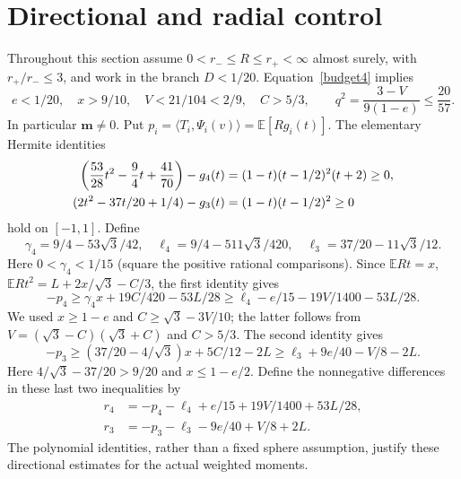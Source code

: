 \documentclass[11pt]{article}
\theoremstyle{remark}\newtheorem{remark}[theorem]{Remark}
\newcommand{\E}{\mathbb E}
\numberwithin{equation}{section}
\begin{document}
\section{Directional and radial control}\label{sec-directional}
Throughout this section assume $0<r_-\le R\le r_+<\infty$ almost surely,
with $r_+/r_-\le3$, and work in the branch $D<1/20$.
Equation~\eqref{budget4} implies
\begin{equation}\label{smallbranch}
 e<1/20,\quad x>9/10,\quad V<21/104<2/9,\quad C>5/3,
 \qquad q^2=\frac{3-V}{9(1-e)}\le\frac{20}{57}.
\end{equation}
In particular $\mathbf m\ne0$. Put $p_i=\langle T_i,\Psi_i(v)\rangle
=\E[Rg_i(t)]$. The elementary Hermite identities
\begin{align}\label{Hermite}
 \left(\frac{53}{28}t^2-\frac94t+\frac{41}{70}\right)-g_4(t)
       &=(1-t)(t-1/2)^2(t+2)\ge0,\notag\\
 (2t^2-37t/20+1/4)-g_3(t)
       &=(1-t)(t-1/2)^2\ge0
\end{align}
hold on $[-1,1]$. Define
\[
 \gamma_4=9/4-53\sqrt3/42,\quad
 \ell_4=9/4-511\sqrt3/420,\quad
 \ell_3=37/20-11\sqrt3/12.
\]
Here $0<\gamma_4<1/15$ (square the positive rational comparisons).
Since $\E Rt=x$, $\E Rt^2=L+2x/\sqrt3-C/3$, the first identity gives
\[
 -p_4\ge\gamma_4x+19C/420-53L/28
       \ge\ell_4-e/15-19V/1400-53L/28.
\]
We used $x\ge1-e$ and $C\ge\sqrt3-3V/10$; the latter follows from
$V=(\sqrt3-C)(\sqrt3+C)$ and $C>5/3$.
The second identity gives
\[
 -p_3\ge(37/20-4/\sqrt3)x+5C/12-2L
       \ge\ell_3+9e/40-V/8-2L.
\]
Here $4/\sqrt3-37/20>9/20$ and $x\le1-e/2$.
Define the nonnegative differences in these last two inequalities by
\begin{align*}
 r_4&=-p_4-\ell_4+e/15+19V/1400+53L/28,\\
 r_3&=-p_3-\ell_3-9e/40+V/8+2L.
\end{align*}
The polynomial identities, rather than a fixed sphere assumption,
justify these directional estimates for the actual weighted moments.
\end{document}
